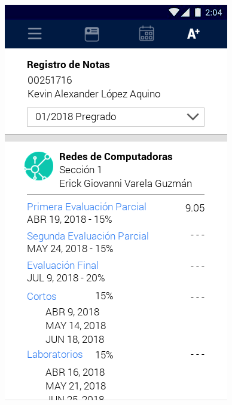 \documentclass[12pt]{article}
\begin{document}
\begin{figure}[!tbp]
\begin{minipage}[b]{0.45\textwidth}
		\includegraphics[width=\textwidth]{img/6.png}
	\end{minipage}
\end{figure}
\end{document}
